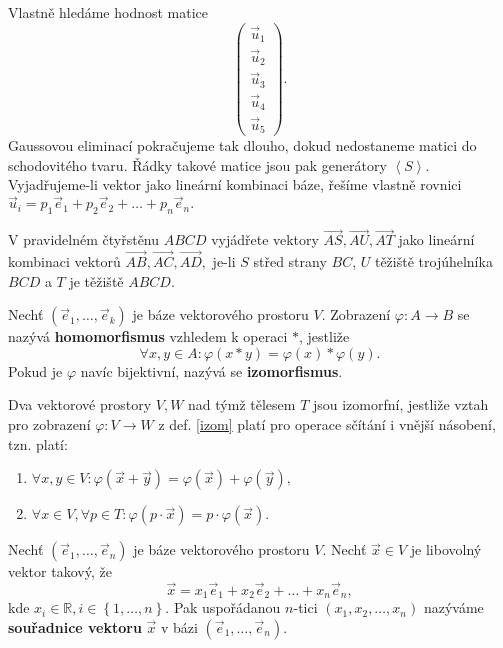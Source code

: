 \begin{reseni}
Vlastně hledáme hodnost matice
$$
\begin{pmatrix}
    \vec u_1\\
   \vec u_2\\
  \vec u_3\\
 \vec u_4\\
\vec u_5
\end{pmatrix}.
$$
Gaussovou eliminací pokračujeme tak dlouho, dokud nedostaneme matici do schodovitého tvaru.
Řádky takové matice jsou pak generátory $\left < S \right > .$
Vyjadřujeme-li vektor jako lineární kombinaci báze, řešíme vlastně rovnici
$\vec u_i = p_1\vec e_1 + p_2\vec e_2 +\dots + p_n\vec e_n.$
\end{reseni}

\begin{priklad}V pravidelném čtyřstěnu $ABCD$ vyjádřete vektory $\overrightarrow{AS},\overrightarrow{AU},\overrightarrow{AT}$ jako
lineární kombinaci vektorů $\overrightarrow{AB},\overrightarrow{AC},\overrightarrow{AD},$
je-li $S$ střed strany $BC$, $U$ těžiště trojúhelníka $BCD$ a $T$ je těžiště
$ABCD$.
\end{priklad}

\begin{definition}\label{izom}
    Nechť $(\vec e_1,\dots, \vec e_k)$ je báze vektorového prostoru $V$. Zobrazení
    $\varphi: A\to B$ se nazývá \textbf{homomorfismus} vzhledem k operaci $*$, jestliže
    $$\forall x,y \in A:\varphi(x*y)=\varphi(x)*\varphi(y).$$
    Pokud je $\varphi$ navíc bijektivní, nazývá se \textbf{izomorfismus}.
\end{definition}

\begin{pozn}
    Dva vektorové prostory $V,W$ nad týmž tělesem $T$ jsou izomorfní, jestliže vztah pro zobrazení $\varphi:V\to W$ z def. \ref{izom} platí pro
    operace sčítání i vnější násobení, tzn. platí:
    \begin{enumerate}[$i.$]
    \item $\forall x,y \in V: \varphi(\vec x+\vec y)=\varphi(\vec x)+\varphi(\vec y),$
    	\item $\forall x \in V, \forall p \in T: \varphi(p\cdot \vec x) = p\cdot \varphi(\vec x).$
    \end{enumerate}
\end{pozn}

\begin{definition}
    Nechť $(\vec e_1, \dots, \vec e_n)$ je báze vektorového prostoru $V$. Nechť
    $\vec x \in V$ je libovolný vektor takový, že
    $$\vec x = x_1\vec e_1 + x_2\vec e_2 + \dots + x_n\vec e_n,$$
    kde $x_i \in \mathbb R, i\in \left \{ 1,\dots,n \right \} .$ Pak uspořádanou
    $n$-tici $(x_1, x_2,\dots,x_n)$ nazýváme \textbf{souřadnice vektoru} $\vec x$ v
    bázi $(\vec e_1, \dots, \vec e_n)$.
\end{definition}


